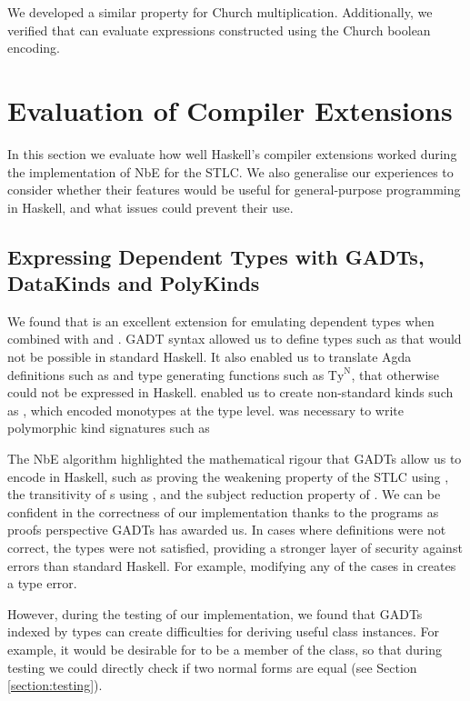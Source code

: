 We developed a similar property for Church multiplication. Additionally, we verified that  can evaluate expressions constructed using the Church boolean encoding.

\section{Evaluation of Compiler Extensions}

In this section we evaluate how well Haskell's compiler extensions worked during the implementation of NbE for the STLC. We also generalise our experiences to consider whether their features would be useful for general-purpose programming in Haskell, and what issues could prevent their use.

\subsection{Expressing Dependent Types with GADTs, DataKinds and PolyKinds}
\label{subsect:GADTanalysis}

We found that  is an excellent extension for emulating dependent types when combined with  and . GADT syntax allowed us to define types such as  that would not be possible in standard Haskell. It also enabled us to translate Agda  definitions such as  and type generating functions such as $\text{Ty}^\text{N}$, that otherwise could not be expressed in Haskell.  enabled us to create non-standard kinds such as , which encoded monotypes at the type level.  was necessary to write polymorphic kind signatures such as 

The NbE algorithm highlighted the mathematical rigour that GADTs allow us to encode in Haskell, such as proving the weakening property of the STLC using , the transitivity of s using , and the subject reduction property of . We can be confident in the correctness of our implementation thanks to the programs as proofs perspective GADTs has awarded us. In cases where definitions were not correct, the types were not satisfied, providing a stronger layer of security against errors than standard Haskell. For example, modifying any of the cases in  creates a type error.

However, during the testing of our implementation, we found that GADTs indexed by types can create difficulties for deriving useful class instances. For example, it would be desirable for  to be a member of the  class, so that during testing we could directly check if two normal forms are equal (see Section \ref{section:testing}). 

